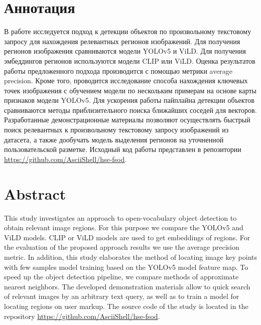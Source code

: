 \documentclass[a4paper,14pt]{article}
\begin{document}
    

    \section*{\normalsize \hfill Аннотация \hfill}

    В работе исследуется подход к детекции объектов по произвольному текстовому запросу для нахождения релевантных регионов изображений.
    Для получения регионов изображения сравниваются модели YOLOv5 и ViLD.
    Для получения эмбеддингов регионов используются модели CLIP или ViLD.
    Оценка результатов работы предложенного подхода производится с помощью метрики average precision.
	Кроме того, проводится исследование способа нахождения ключевых точек изображения с обучением модели по нескольким примерам на основе карты признаков модели YOLOv5.
	Для ускорения работы пайплайна детекции объектов сравниваются методы приблизительного поиска ближайших соседей для векторов.
	Разработанные демонстрационные материалы позволяют осуществлять быстрый поиск релевантных к произвольному текстовому запросу изображений из датасета, а также дообучать модель выделения регионов на уточненной пользовательской разметке.
	Исходный код работы представлен в репозитории \url{https://github.com/AsciiShell/hse-fsod}.

    \sloppy
    \newpage

    \section*{\normalsize \hfill Abstract \hfill}

    This study investigates an approach to open-vocabulary object detection to obtain relevant image regions.
    For this purpose we compare the YOLOv5 and ViLD models.
    CLIP or ViLD models are used to get embeddings of regions.
    For the evaluation of the proposed approach results we use the average precision metric.
    In addition, this study elaborates the method of locating image key points with few samples model training based on the YOLOv5 model feature map.
    To speed up the object detection pipeline, we compare methods of approximate nearest neighbors.
    The developed demonstration materials allow to quick search of relevant images by an arbitrary text query, as well as to train a model for locating regions on user markup.
    The source code of the study is located in the repository \url{https://github.com/AsciiShell/hse-fsod}.

    \newpage
\end{document}
